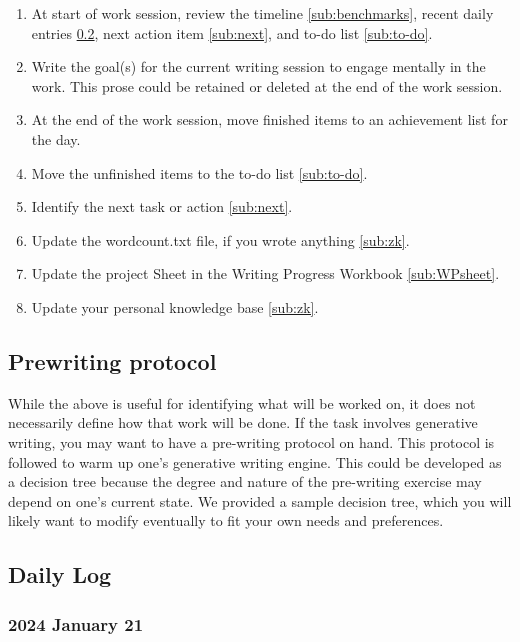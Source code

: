 \documentclass[10pt,letterpaper]{article}
\newcommand{\be}{\begin{enumerate}}
\newcommand{\ee}{\end{enumerate}}
\begin{document}
\be
\item At start of work session, review the timeline \ref{sub:benchmarks}, recent daily entries \ref{sub:daily-log}, next action item \ref{sub:next}, and to-do list \ref{sub:to-do}.
\item Write the goal(s) for the current writing session to engage mentally in the work. This prose could be retained or deleted at the end of the work session.
\item At the end of the work session, move finished items to an achievement list for the day.
\item Move the unfinished items to the to-do list \ref{sub:to-do}.
\item Identify the next task or action \ref{sub:next}.
\item Update the wordcount.txt file, if you wrote anything \ref{sub:zk}.
\item Update the project Sheet in the Writing Progress Workbook \ref{sub:WPsheet}.
\item Update your personal knowledge base \ref{sub:zk}.
\ee


\subsection{Prewriting protocol}
\label{sub:prewritng-protocol}

While the above is useful for identifying what will be worked on, it does not necessarily define how that work will be done.
If the task involves generative writing, you may want to have a pre-writing protocol on hand.
This protocol is followed to warm up one's generative writing engine.
This could be developed as a decision tree because the degree and nature of the pre-writing exercise may depend on one's current state.
We provided a sample decision tree, which you will likely want to modify eventually to fit your own needs and preferences.




\subsection{Daily Log}
\label{sub:daily-log}


\subsubsection{2024 January 21}
\end{document}
